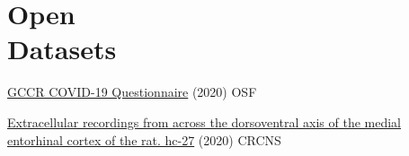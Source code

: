 \documentclass[10pt]{cooperCV2}
\begin{document}
%	






\section{Open\\Datasets}

 
\begin{etaremune}[itemindent=-1.5\bibhang, topsep=0pt,
                   itemsep=\bibsep,partopsep=0pt,parsep=0pt,leftmargin={\bibhang+\widthof{[999]}}] 
    
    \item \href{https://osf.io/a3vkw/}{GCCR COVID-19 Questionnaire} (2020) OSF
    
    \item \href{https://crcns.org/data-sets/hc/hc-27/about-hc-27}{Extracellular recordings from across the dorsoventral axis of the medial entorhinal cortex of the rat. hc-27} (2020) CRCNS
    

\end{etaremune}








%	






\needspace{\headerpush}
\myRule{\columnwidth}{1pt}\\

 
\end{document}
